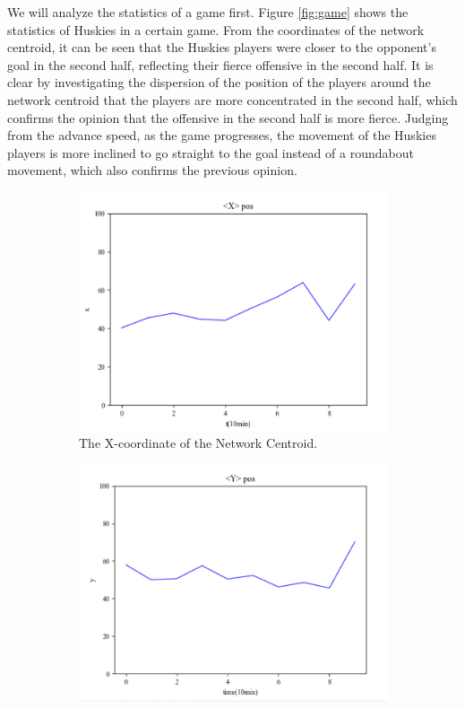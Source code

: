 \documentclass{mcmthesis}
\begin{document}
	We will analyze the statistics of a game first. Figure \ref{fig:game} shows the statistics of Huskies in a certain game.  From the coordinates of the network centroid, it can be seen that the Huskies players were closer to the opponent's goal in the second half, reflecting their fierce offensive in the second half.  It is clear by investigating the dispersion of the position of the players around the network centroid that the players are more concentrated in the second half, which confirms the opinion that the offensive in the second half is more fierce.  Judging from the advance speed, as the game progresses, the movement of the Huskies players is more inclined to go straight to the goal instead of a roundabout movement, which also confirms the previous opinion.
	\begin{figure}[h]
		\centering
		\begin{subfigure}[b]{0.5\textwidth}
			\includegraphics[width=\textwidth]{figures/xc1.png}
			\caption{The X-coordinate of the Network Centroid.}
			\label{fig:x1}
		\end{subfigure}%
		\begin{subfigure}[b]{0.5\textwidth}
			\includegraphics[width=\textwidth]{figures/yc1.png}

\end{subfigure}
\end{figure}
\end{document}
